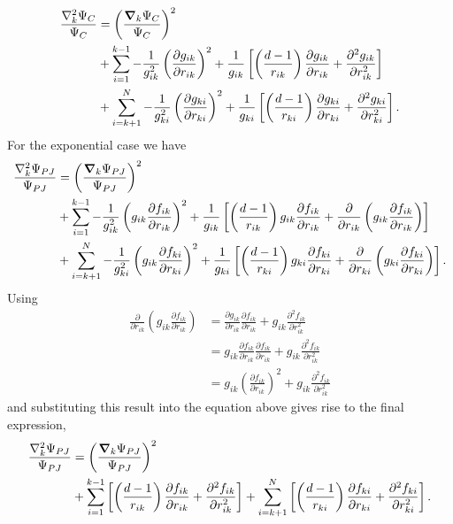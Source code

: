\begin{align}
 \frac{\nabla_{k}^2 \Psi_C}{\Psi_C} & =  \left(\frac{\boldsymbol{\nabla}_k \Psi_C}{\Psi_C}\right)^2 \nonumber\\
 & + \sum_{i=1}^{k-1} -\frac{1}{g_{ik}^2}\left(\frac{\partial g_{ik}}{\partial r_{ik}}\right)^2 + \frac{1}{g_{ik}}\left[\left(\frac{d-1}{r_{ik}}\right)\frac{\partial g_{ik}}{\partial r_{ik}} + \frac{\partial^2 g_{ik}}{\partial r_{ik}^2} \right]\nonumber\\
 & + \sum_{i=k+1}^{N} -\frac{1}{g_{ki}^2}\left(\frac{\partial g_{ki}}{\partial r_{ki}}\right)^2 + \frac{1}{g_{ki}}\left[\left(\frac{d-1}{r_{ki}}\right)\frac{\partial g_{ki}}{\partial r_{ki}} + \frac{\partial^2 g_{ki}}{\partial r_{ki}^2} \right].
\end{align}
For the exponential case we have
\begin{align*}
 \frac{\nabla_{k}^2 \Psi_{PJ}}{\Psi_{PJ}} & =  \left(\frac{\boldsymbol{\nabla}_k \Psi_{PJ}}{\Psi_{PJ}}\right)^2 \nonumber\\
 & + \sum_{i=1}^{k-1} -\frac{1}{g_{ik}^2}\left(g_{ik}\frac{\partial f_{ik}}{\partial r_{ik}}\right)^2 + \frac{1}{g_{ik}}\left[\left(\frac{d-1}{r_{ik}}\right)g_{ik}\frac{\partial f_{ik}}{\partial r_{ik}} + \frac{\partial }{\partial r_{ik}}\left(g_{ik}\frac{\partial f_{ik}}{\partial r_{ik}}\right) \right]\nonumber\\
 & + \sum_{i=k+1}^{N} -\frac{1}{g_{ki}^2}\left(g_{ik}\frac{\partial f_{ki}}{\partial r_{ki}}\right)^2 + \frac{1}{g_{ki}}\left[\left(\frac{d-1}{r_{ki}}\right)g_{ki}\frac{\partial f_{ki}}{\partial r_{ki}} + \frac{\partial }{\partial r_{ki}}\left(g_{ki}\frac{\partial f_{ki}}{\partial r_{ki}}\right) \right].
 \end{align*}
Using
\begin{align*}
 \frac{\partial }{\partial r_{ik}}\left(g_{ik}\frac{\partial f_{ik}}{\partial r_{ik}}\right) & = \frac{\partial g_{ik}}{\partial r_{ik}}\frac{\partial f_{ik}}{\partial r_{ik}} + g_{ik}\frac{\partial^2 f_{ik}}{\partial r_{ik}^2}\\
 & = g_{ik}\frac{\partial f_{ik}}{\partial r_{ik}}\frac{\partial f_{ik}}{\partial r_{ik}} + g_{ik}\frac{\partial^2 f_{ik}}{\partial r_{ik}^2}\\
 & = g_{ik}\left(\frac{\partial f_{ik}}{\partial r_{ik}}\right)^2 + g_{ik}\frac{\partial^2 f_{ik}}{\partial r_{ik}^2}
\end{align*}
and substituting this result into the equation above gives rise to the final expression,
\begin{align}\label{lapJasRatio}
\frac{\nabla_{k}^2 \Psi_{PJ}}{\Psi_{PJ}}  &=  \left(\frac{\boldsymbol{\nabla}_k \Psi_{PJ}}{\Psi_{PJ}}\right)^2\nonumber\\
  &+ \sum_{i=1}^{k-1} \left[\left(\frac{d-1}{r_{ik}}\right)\frac{\partial f_{ik}}{\partial r_{ik}} + \frac{\partial^2  f_{ik}}{\partial r_{ik}^2} \right]
  + \sum_{i=k+1}^{N} \left[\left(\frac{d-1}{r_{ki}}\right)\frac{\partial f_{ki}}{\partial r_{ki}} + \frac{\partial^2 f_{ki}}{\partial r_{ki}^2} \right].
 \end{align}

